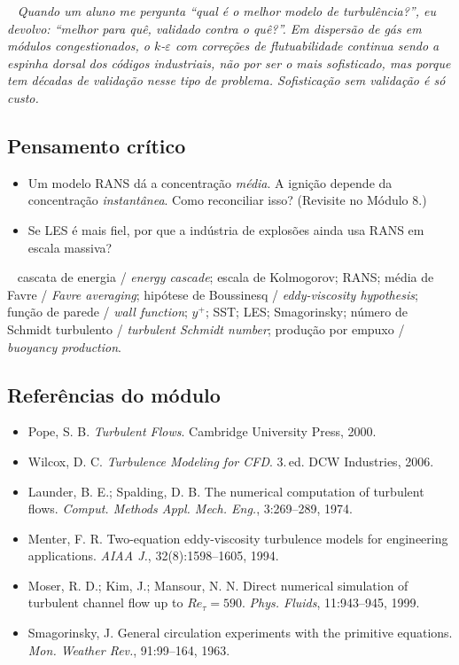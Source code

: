 \documentclass[10pt,a4paper,twocolumn,openany]{report}
\newcommand{\lead}[2]{\par\medskip\noindent{\color{#1}\bfseries #2}\ }
\newenvironment{professor}{\lead{laranja}{Nota do professor.}\itshape}{\par\medskip}
\newenvironment{critico}{\subsection*{\textcolor{roxo}{Pensamento crítico}}}{\par}
\newenvironment{chaves}{\lead{cinza}{Palavras-chave (PT/EN):}\small}{\par}
\newenvironment{refs}{\subsection*{Referências do módulo}\small}{\par}
\begin{document}
\begin{professor}
Quando um aluno me pergunta ``qual é o melhor modelo de turbulência?'', eu
devolvo: ``melhor para quê, validado contra o quê?''. Em dispersão de gás em
módulos congestionados, o $k$-$\varepsilon$ com correções de flutuabilidade
continua sendo a espinha dorsal dos códigos industriais, não por ser o mais
sofisticado, mas porque tem décadas de validação \emph{nesse tipo de
problema}. Sofisticação sem validação é só custo.
\end{professor}

\begin{critico}
\begin{itemize}
  \item Um modelo RANS dá a concentração \emph{média}. A ignição depende da
        concentração \emph{instantânea}. Como reconciliar isso? (Revisite no Módulo 8.)
  \item Se LES é mais fiel, por que a indústria de explosões ainda usa RANS
        em escala massiva?
\end{itemize}
\end{critico}

\begin{chaves}
cascata de energia / \emph{energy cascade}; escala de Kolmogorov; RANS;
média de Favre / \emph{Favre averaging}; hipótese de Boussinesq /
\emph{eddy-viscosity hypothesis}; função de parede / \emph{wall function};
$y^+$; SST; LES; Smagorinsky; número de Schmidt turbulento /
\emph{turbulent Schmidt number}; produção por empuxo / \emph{buoyancy production}.
\end{chaves}

\begin{refs}
\begin{itemize}
  \item Pope, S. B. \emph{Turbulent Flows}. Cambridge University Press, 2000.
  \item Wilcox, D. C. \emph{Turbulence Modeling for CFD}. 3.\,ed. DCW Industries, 2006.
  \item Launder, B. E.; Spalding, D. B. The numerical computation of turbulent flows. \emph{Comput. Methods Appl. Mech. Eng.}, 3:269--289, 1974.
  \item Menter, F. R. Two-equation eddy-viscosity turbulence models for engineering applications. \emph{AIAA J.}, 32(8):1598--1605, 1994.
  \item Moser, R. D.; Kim, J.; Mansour, N. N. Direct numerical simulation of turbulent channel flow up to $Re_\tau=590$. \emph{Phys. Fluids}, 11:943--945, 1999.
  \item Smagorinsky, J. General circulation experiments with the primitive equations. \emph{Mon. Weather Rev.}, 91:99--164, 1963.
\end{itemize}
\end{refs}
\end{document}
